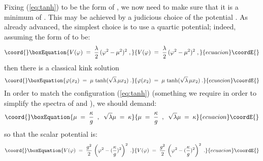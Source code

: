 \documentclass[a4paper,12pt]{article}
\begin{document}
Fixing (\ref{eq:tanh}) to be the form of \myHighlight{$\varphi$}\coordHE{}, we now need to
make sure that it is a minimum of \coordHE{}. This may be achieved by a 
judicious choice of the potential \coordHE{}. 
As already advanced, the simplest choice is to use a quartic potential; 
indeed, assuming the form of \coordHE{} to be:
\begin{equation}\coord{}\boxEquation{
  \label{eq:vform}
V(\varphi) \;=\; \frac{\lambda}{2} \, (\varphi^2 - \mu^2)^2 \;,
}{
  V(\varphi) \;=\; \frac{\lambda}{2} \, (\varphi^2 - \mu^2)^2 \;,
}{ecuacion}\coordE{}\end{equation}
then there is a classical kink solution
\begin{equation}\coord{}\boxEquation{
  \label{eq:ksol}
\varphi(x_2) \;=\; \mu \, \tanh (\sqrt{\lambda}\, \mu x_2) \;.
}{
  \varphi(x_2) \;=\; \mu \, \tanh (\sqrt{\lambda}\, \mu x_2) \;.
}{ecuacion}\coordE{}\end{equation}
In order to match the configuration (\ref{eq:tanh}) (something we
require in order to simplify the spectra of \coordHE{} and \coordHE{}), 
we should demand:
\begin{equation}\coord{}\boxEquation{
  \label{eq:fparm}
\mu \;=\; \frac{\kappa}{g} \;\;,\;\; \sqrt{\lambda} \mu \;=\; \kappa 
}{
  \mu \;=\; \frac{\kappa}{g} \;\;,\;\; \sqrt{\lambda} \mu \;=\; \kappa 
}{ecuacion}\coordE{}\end{equation}
so that the scalar potential is:
\begin{equation}\coord{}\boxEquation{
  \label{eq:vform1}
V(\varphi) \;=\; \frac{g^2}{2} \, \left(\varphi^2 - (\frac{\kappa}{g})^2\right)^2 \;.
}{
  V(\varphi) \;=\; \frac{g^2}{2} \, \left(\varphi^2 - (\frac{\kappa}{g})^2\right)^2 \;.
}{ecuacion}\coordE{}\end{equation}
\end{document}

